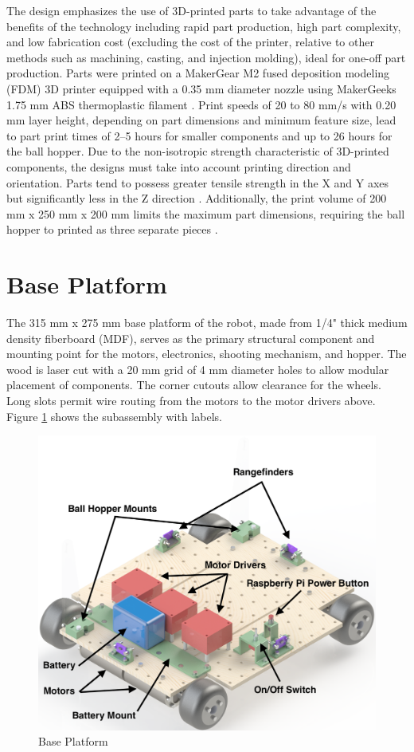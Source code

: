 The design emphasizes the use of 3D-printed parts to take advantage of the benefits of the technology including rapid part production, high part complexity, and low fabrication cost (excluding the cost of the printer, relative to other methods such as machining, casting, and injection molding), ideal for one-off part production. Parts were printed on a MakerGear M2 fused deposition modeling (FDM) 3D printer equipped with a 0.35 mm diameter nozzle using MakerGeeks 1.75 mm ABS thermoplastic filament \cite{makergear_m2}\cite{makergeeks}. Print speeds of 20 to 80 mm/s with 0.20 mm layer height, depending on part dimensions and minimum feature size, lead to part print times of 2--5 hours for smaller components and up to 26 hours for the ball hopper. Due to the non-isotropic strength characteristic of 3D-printed components, the designs must take into account printing direction and orientation. Parts tend to possess greater tensile strength in the X and Y axes but significantly less in the Z direction \cite{3dhubs_orientation}. Additionally, the print volume of 200 mm x 250 mm x 200 mm limits the maximum part dimensions, requiring the ball hopper to printed as three separate pieces \cite{makergear_m2}. 

\section{Base Platform}
The 315 mm x 275 mm base platform of the robot, made from 1/4" thick medium density fiberboard (MDF), serves as the primary structural component and mounting point for the motors, electronics, shooting mechanism, and hopper. The wood is laser cut with a 20 mm grid of 4 mm diameter holes to allow modular placement of components. The corner cutouts allow clearance for the wheels. Long slots permit wire routing from the motors to the motor drivers above. Figure \ref{fig:base_platform} shows the subassembly with labels.

\begin{figure}[H]   %
	\centering \includegraphics[width=6in, height=3.85in, keepaspectratio]{figures/base_platform.png}
	\caption{Base Platform}	\label{fig:base_platform}
\end{figure}

